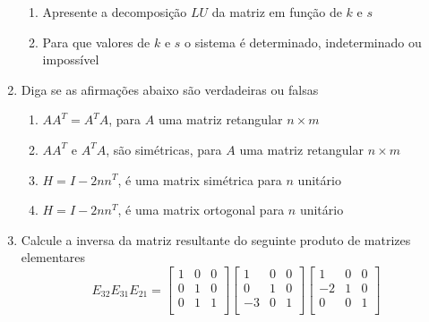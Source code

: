 \documentclass{article}
\begin{document}
\begin{enumerate}
	      \begin{enumerate}
		      \item Apresente a decomposição $LU$ da matriz em função de $k$ e $s$
		      \item Para que valores de $k$ e $s$ o sistema é determinado,
		            indeterminado ou impossível
	      \end{enumerate}
	\item Diga se as afirmações abaixo são verdadeiras ou falsas
	      \begin{enumerate}
		      \item $AA^T = A^TA$, para $A$ uma matriz retangular $n \times m$
		      \item $AA^T$ e $A^TA$, são simétricas, para $A$ uma matriz retangular $n \times m$
		      \item $H = I - 2nn^T$, é uma matrix simétrica para $n$ unitário
		      \item $H = I - 2nn^T$, é uma matrix ortogonal para $n$ unitário
	      \end{enumerate}

	\item Calcule a inversa da matriz resultante do seguinte produto de matrizes elementares
	      $$ E_{32} E_{31} E_{21} = \begin{bmatrix}
			      1 & 0 & 0 \\
			      0 & 1 & 0 \\
			      0 & 1 & 1 \\
		      \end{bmatrix} \begin{bmatrix}
			      1  & 0 & 0 \\
			      0  & 1 & 0 \\
			      -3 & 0 & 1 \\
		      \end{bmatrix} \begin{bmatrix}
			      1  & 0 & 0 \\
			      -2 & 1 & 0 \\
			      0  & 0 & 1 \\
		      \end{bmatrix} $$
\end{enumerate}
\end{document}
